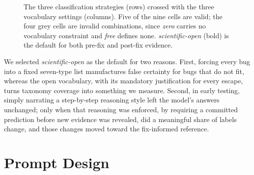 \documentclass{iutbscthesis}
\begin{document}
\begin{figure}[!htbp]
\centering
{}
\caption{The three classification strategies (rows) crossed with the three vocabulary settings (columns). Five of the nine cells are valid; the four grey cells are invalid combinations, since \textit{zero} carries no vocabulary constraint and \textit{free} defines none. \textit{scientific-open} (bold) is the default for both pre-fix and post-fix evidence.}
\label{fig:conditions}
\end{figure}

We selected \textit{scientific-open} as the default for two reasons. First, forcing every bug into a fixed seven-type list manufactures false certainty for bugs that do not fit, whereas the open vocabulary, with its mandatory justification for every escape, turns taxonomy coverage into something we measure. Second, in early testing, simply narrating a step-by-step reasoning style left the model's answers unchanged; only when that reasoning was enforced, by requiring a committed prediction before new evidence was revealed, did a meaningful share of labels change, and those changes moved toward the fix-informed reference.

\section{Prompt Design}
\end{document}
